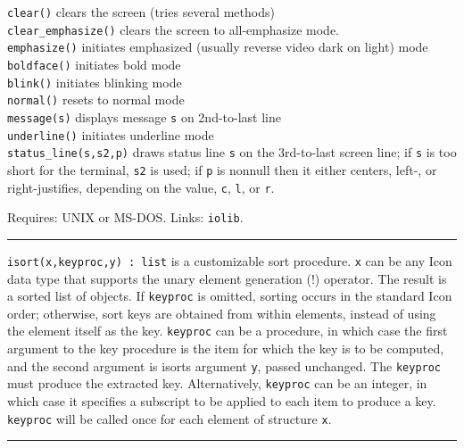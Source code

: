 \texttt{clear()} clears the screen (tries several methods)\\
\texttt{clear\_emphasize()} clears the screen to all-emphasize
mode.\\
\texttt{emphasize()} initiates emphasized (usually reverse video dark on
light) mode\\
\texttt{boldface()} initiates bold mode\\
\texttt{blink()} initiates blinking mode\\
\texttt{normal()} resets to normal mode\\
\texttt{message(s)} displays message \texttt{s} on 2nd-to-last
line\\
\texttt{underline()} initiates underline mode\\
\texttt{status\_line(s,s2,p)} draws status line \texttt{s} on the
3rd-to-last screen line; if \texttt{s} is too short for the terminal,
\texttt{s2} is used; if \texttt{p} is nonnull then it either centers,
left-, or right-justifies, depending on the value,
\texttt{{\textquotedbl}c{\textquotedbl}},
\texttt{{\textquotedbl}l{\textquotedbl}}, or
\texttt{{\textquotedbl}r{\textquotedbl}}.

Requires: UNIX or MS-DOS. Links: \texttt{iolib}.

\vspace{0.25cm}\hrule{}

\texttt{i}\texttt{sort}\texttt{(x,keyproc,y) : list} is a
customizable sort procedure. \texttt{x} can be any Icon data type that
supports the unary element generation (!) operator. The result is a
sorted list of objects. If \texttt{keyproc} is omitted, sorting occurs
in the standard Icon order; otherwise, sort keys are obtained from
within elements, instead of using the element itself as the key.
\texttt{keyproc} can be a procedure, in which case the first argument
to the key procedure is the item for which the key is to be computed,
and the second argument is isort{\textquotesingle}s argument
\texttt{y}, passed unchanged. The \texttt{keyproc} must produce the
extracted key. Alternatively, \texttt{keyproc} can be an integer, in
which case it specifies a subscript to be applied to each item to
produce a key. \texttt{keyproc} will be called once for each element of
structure \texttt{x}.

\vspace{0.25cm}\hrule{}


